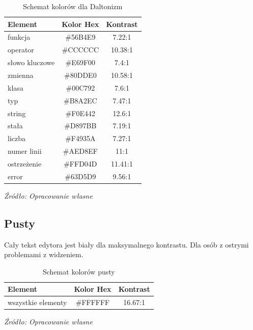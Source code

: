 \begin{table}[ht]
\centering
\caption{Schemat kolorów dla Daltonizm}
\label{tab:dalt}
\begin{tabular}{|>{\raggedright\arraybackslash}p{4cm}|c|c|}
\hline
\textbf{Element} & \textbf{Kolor Hex} & \textbf{Kontrast} \\
\hline
funkcja       & \#56B4E9 & 7.22:1 \\
operator      & \#CCCCCC & 10.38:1 \\
słowo kluczowe & \#E69F00 & 7.4:1 \\
zmienna       & \#80DDE0 & 10.58:1 \\
klasa         & \#00C792 & 7.6:1 \\
typ           & \#B8A2EC & 7.47:1 \\
string        & \#F0E442 & 12.6:1 \\
stała         & \#D897BB & 7.19:1 \\
liczba        & \#F4935A & 7.27:1 \\
numer linii   & \#AED8EF & 11:1 \\
\hline
ostrzeżenie   & \#FFD04D & 11.41:1 \\
error         & \#63D5D9 & 9.56:1 \\
\hline
\end{tabular}
\newline\newline
{\raggedright\fontsize{10pt}{12pt}\selectfont\textit{Źródło: Opracowanie własne}\par}
\end{table}

\subsection{Pusty}
Cały tekst edytora jest biały dla maksymalnego kontrastu. Dla osób z ostrymi problemami z widzeniem.

\begin{table}[ht]
\centering
\caption{Schemat kolorów pusty}
\label{tab:bialy}
\begin{tabular}{|>{\raggedright\arraybackslash}p{4cm}|c|c|}
\hline
\textbf{Element} & \textbf{Kolor Hex} & \textbf{Kontrast} \\
\hline
wszystkie elementy & \#FFFFFF & 16.67:1 \\
\hline
\end{tabular}
\newline\newline
{\raggedright\fontsize{10pt}{12pt}\selectfont\textit{Źródło: Opracowanie własne}\par}
\end{table}
